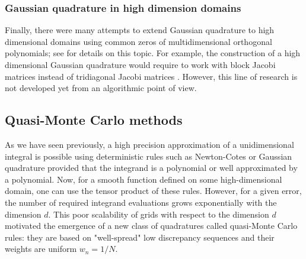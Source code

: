 \documentclass[twoside,11pt]{book}
\numberwithin{theorem}{chapter}
\numberwithin{definition}{chapter}
\numberwithin{proposition}{chapter}
\numberwithin{corollary}{chapter}
\numberwithin{example}{chapter}
\numberwithin{lemma}{chapter}
\numberwithin{assumption}{chapter}
\begin{document}
\subsubsection{Gaussian quadrature in high dimension domains}


Finally, there were many attempts to extend Gaussian quadrature to high dimensional domains using common zeros of multidimensional orthogonal polynomials; see \citep{Xu94} for details on this topic. For example, the construction of a high dimensional Gaussian quadrature would require to work with block Jacobi matrices instead of tridiagonal Jacobi matrices \citep{Xu94b}. However, this line of research is not developed yet from an algorithmic point of view.



 




\subsection{Quasi-Monte Carlo methods}
As we have seen previously, a high precision approximation of a unidimensional integral  is possible using deterministic rules such as Newton-Cotes or Gaussian quadrature provided that the integrand is a polynomial or well approximated by a polynomial. Now, for a smooth function defined on some high-dimensional domain, one can use the tensor product of these rules. However, for a given error, the number of required integrand evaluations grows exponentially with the dimension $d$. This poor scalability of grids with respect to the dimension $d$ motivated the emergence of a new class of quadratures called quasi-Monte Carlo rules: they are based on "well-spread" low discrepancy sequences and their weights are uniform $w_{n} = 1/N$.







\end{document}
